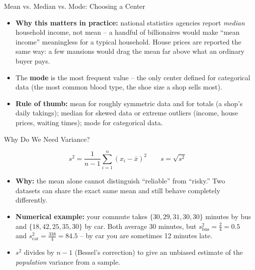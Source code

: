 \begin{frame}{Mean vs. Median vs. Mode: Choosing a Center}
\begin{itemize}
  \item \textbf{Why this matters in practice:} national statistics agencies report \emph{median} household income, not mean -- a handful of billionaires would make ``mean income'' meaningless for a typical household. House prices are reported the same way: a few mansions would drag the mean far above what an ordinary buyer pays.
  \pause
  \item The \textbf{mode} is the most frequent value -- the only center defined for categorical data (the most common blood type, the shoe size a shop sells most).
  \pause
  \item \textbf{Rule of thumb:} mean for roughly symmetric data and for totals (a shop's daily takings); median for skewed data or extreme outliers (income, house prices, waiting times); mode for categorical data.
\end{itemize}
\end{frame}

\begin{frame}{Why Do We Need Variance?}
\begin{rldefinition}
\[
s^2 = \frac{1}{n-1}\sum_{i=1}^{n}(x_i - \bar{x})^2
\qquad
s = \sqrt{s^2}
\]
\end{rldefinition}
\pause
\begin{itemize}
  \item \textbf{Why:} the mean alone cannot distinguish ``reliable'' from ``risky.'' Two datasets can share the exact same mean and still behave completely differently.
  \pause
  \item \textbf{Numerical example:} your commute takes $\{30, 29, 31, 30, 30\}$ minutes by bus and $\{18, 42, 25, 35, 30\}$ by car. Both average $30$ minutes, but $s^2_{\text{bus}} = \frac{2}{4} = 0.5$ and $s^2_{\text{car}} = \frac{338}{4} = 84.5$ -- by car you are sometimes 12 minutes late.
  \pause
  \item $s^2$ divides by $n-1$ (Bessel's correction) to give an unbiased estimate of the \emph{population} variance from a sample.
\end{itemize}
\end{frame}

